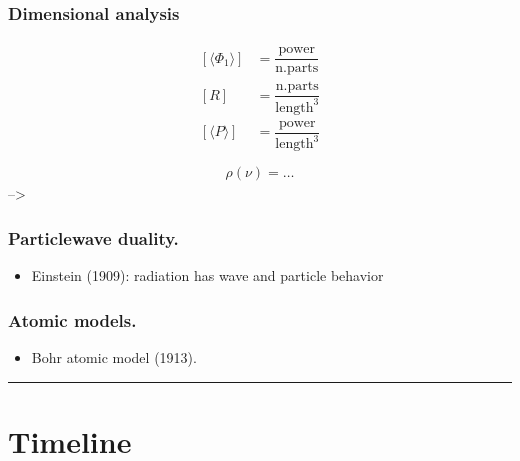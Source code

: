 \documentclass[letterpaper,10pt,english]{jupyterBook}
\begin{document}
\begin{itemize}
\begin{itemize}
\subsubsection*{Dimensional analysis}
\begin{equation*}
\begin{split}\begin{aligned}
[ \langle \Phi_1 \rangle ] & = \dfrac{\text{power}}{\text{n.parts}} \\
[ R ] & = \dfrac{\text{n.parts}}{\text{length}^3} \\
[ \langle P \rangle ] & = \dfrac{\text{power}}{\text{length}^3} \\
\end{aligned}\end{split}
\end{equation*}\begin{equation*}
\begin{split}\rho(\nu) = \dots\end{split}
\end{equation*}
\sphinxAtStartPar
–>

\end{itemize}

\end{itemize}
\subsubsection*{Particle\sphinxhyphen{}wave duality.}
\begin{itemize}
\item {} 
\sphinxAtStartPar
Einstein (1909): radiation has wave and particle behavior

\end{itemize}
\subsubsection*{Atomic models.}
\begin{itemize}
\item {} 
\sphinxAtStartPar
Bohr atomic model (1913).

\end{itemize}


\bigskip\hrule\bigskip


\sphinxstepscope


\section{Timeline}
\label{\detokenize{ch/quantum-mechanics/history/timeline:timeline}}\label{\detokenize{ch/quantum-mechanics/history/timeline:quantum-mechanics-history-timeline}}\label{\detokenize{ch/quantum-mechanics/history/timeline::doc}}
\sphinxstepscope
\end{document}
